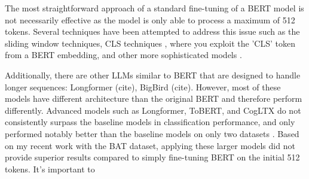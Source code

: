 The most straightforward approach of a standard fine-tuning of a BERT model is not necessarily effective as the model is only able to process a maximum of 512 tokens. Several techniques have been attempted to address this issue such as the sliding window techniques, CLS techniques \cite{su-2021-classifying}, where you exploit the 'CLS' token from a BERT embedding, and other more sophisticated models \cite{kulkarni-2018-multi-view}.

Additionally, there are other LLMs similar to BERT that are designed to handle longer sequences: Longformer (cite), BigBird (cite). However, most of these models have different architecture than the original BERT and therefore perform differently.
Advanced models such as Longformer, ToBERT, and CogLTX do not consistently surpass the baseline models in classification performance, and only performed notably better than the baseline models on only two datasets \cite{park-2022-efficient}. Based on my recent work with the BAT dataset, applying these larger models did not provide superior results compared to simply fine-tuning BERT on the initial 512 tokens. It's important to


\lipsum[66]

